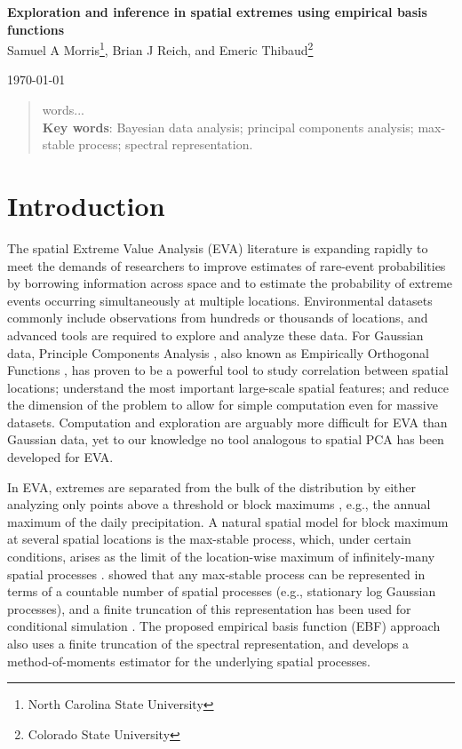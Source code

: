 \documentclass[11pt]{article}
\begin{document}
\linenumbers
\pagestyle{empty}
\begin{center}
{\Large {\bf Exploration and inference in spatial extremes using empirical basis functions}}\\

{\large Samuel A Morris\footnote[1]{North Carolina State University}, Brian J Reich\footnotemark[1]{}, and Emeric Thibaud\footnote[2]{Colorado State University}}

\today
\end{center}


\begin{abstract}
	words...\\
	{\bf Key words}: Bayesian data analysis; principal components analysis; max-stable process; spectral representation.

\end{abstract}
\newpage
\pagestyle{plain}
\setcounter{page}{1}

\section{Introduction}\label{ebs:intro}
The spatial Extreme Value Analysis (EVA) literature is expanding rapidly \citep{Davison2012} to meet the demands of researchers to improve estimates of rare-event probabilities by borrowing information across space and to estimate the probability of extreme events occurring simultaneously at multiple locations.
Environmental datasets commonly include observations from hundreds or thousands of locations, and advanced tools are required to explore and analyze these data.
For Gaussian data, Principle Components Analysis \citep[PCA]{Everitt2008}, also known as Empirically Orthogonal Functions \citep[EOF]{Toggweiler2001}, has proven to be a powerful tool to study correlation between spatial locations; understand the most important large-scale spatial features; and reduce the dimension of the problem to allow for simple computation even for massive datasets.
Computation and exploration are arguably more difficult for EVA than Gaussian data, yet to our knowledge no tool analogous to spatial PCA has been developed for EVA.

In EVA, extremes are separated from the bulk of the distribution by either analyzing only points above a threshold or block maximums \citep{Coles2001}, e.g., the annual maximum of the daily precipitation.
A natural spatial model for block maximum at several spatial locations is the max-stable process, which, under certain conditions, arises as the limit of the location-wise maximum of infinitely-many spatial processes \citep{deHaan2006}.
 showed that any max-stable process can be represented in terms of a countable number of spatial processes (e.g., stationary log Gaussian processes), and a finite truncation of this representation has been used for conditional simulation \citep{Wang2011}.
The proposed empirical basis function (EBF) approach also uses a finite truncation of the spectral representation, and develops a method-of-moments estimator for the underlying spatial processes.
\end{document}
